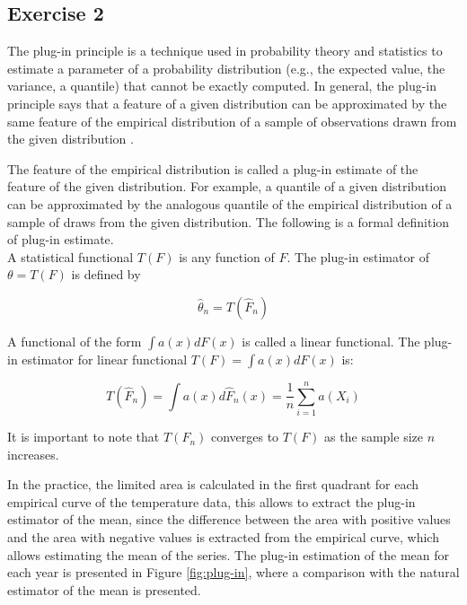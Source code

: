 \documentclass[11pt]{article}
\theoremstyle{definition}
\theoremstyle{remark}
\theoremstyle{remark}
\begin{document}
\subsection*{Exercise 2}

The plug-in principle is a technique used in probability theory and
statistics to estimate a parameter of a probability distribution (e.g.,
the expected value, the variance, a quantile) that cannot be exactly computed.
In general, the plug-in principle says that a feature of a
given distribution can be approximated by the same feature of the
empirical distribution of a sample of observations drawn from the
given distribution \cite{van2000asymptotic}.

The feature of the empirical distribution is called a plug-in estimate
of the feature of the given distribution. For example, a quantile of a
given distribution can be approximated by the analogous quantile of
the empirical distribution of a sample of draws from the given
distribution. The following is a formal definition of plug-in estimate.
\\

A statistical functional $T(F)$ is any function of $F$. The plug-in estimator of $\theta=T(F)$ is defined by

\[
  \widehat{\theta}_{n}=T\left(\widehat{F}_{n}\right)
\]

A functional of the form $\int a(x) d F(x)$ is called a linear
functional. The plug-in estimator for linear functional $T(F)=\int a(x) d F(x)$
is:

\[
  T\left(\widehat{F}_{n}\right)=\int a(x) d
  \widehat{F}_{n}(x)=\frac{1}{n} \sum_{i=1}^{n} a\left(X_{i}\right)
\]

It is important to note that $T\left(F_{n}\right)$ converges to $T(F)$
as the sample size $n$ increases.

In the practice, the limited area is calculated in the first quadrant
for each empirical curve of the temperature data, this allows to
extract the plug-in estimator of the mean, since the difference
between the area with positive values and the area with negative
values is extracted from the empirical curve, which allows estimating
the mean of the series. The plug-in estimation of the mean for each
year is presented in Figure \ref{fig:plug-in}, where a comparison with
the natural estimator of the mean is presented.
\end{document}
